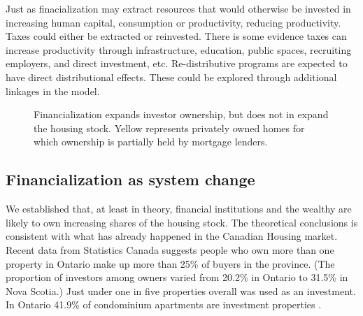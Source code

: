 Just as finacialization may extract resources that would otherwise be invested in increasing human capital, consumption or productivity, reducing productivity. Taxes could either be extracted or reinvested. There is some evidence taxes can increase productivity through infrastructure, education, public spaces, recruiting employers, and direct investment, etc. Re-distributive programs are expected to have direct distributional effects. These could be explored through additional linkages in the model.








 

\begin{figure}[ht]
\begin{center}

\end{center}
\caption{Financialization expands investor ownership, but does not in expand the housing stock. Yellow represents privately owned homes for which ownership is partially held by mortgage lenders.}
\label{fig-financialization-expansion}
\end{figure}



\subsection{Financialization as system change} \label{section-system}
We established that, at least in theory, financial institutions and the wealthy are likely to own increasing shares of the housing stock. The theoretical conclusions is consistent with what has already happened in the Canadian Housing market. Recent data from Statistics Canada \cite{fontaineResidentialRealEstate2023} suggests people who own more than one property in Ontario make up more than 25\% of buyers in the province. (The proportion of investors among owners varied from 20.2\% in Ontario to 31.5\% in Nova Scotia.)
Just under one in five properties overall was used as an investment.
In Ontario 41.9\% of condominium apartments are investment properties \cite{statisticscanadaBuyRentHousing2022}.

